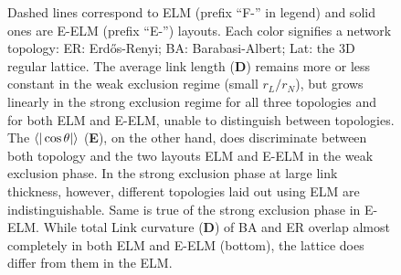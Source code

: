 \documentclass[nofootinbib,preprint,floatfix,titlepage,endfloats]{revtex4} %
\begin{document}
\begin{figure}
{         Dashed lines correspond to ELM (prefix ``F-'' in legend) and solid ones are E-ELM (prefix ``E-'') layouts. Each color signifies a network topology: ER: Erdős-Renyi; BA: Barabasi-Albert; Lat: the 3D regular lattice. 
         The average link length ({\bf D})  
         remains more or less constant in the weak exclusion regime (small $r_L/r_N$), but grows linearly in the strong exclusion regime for all three topologies and for both ELM and E-ELM, unable to distinguish between topologies.  
         The $\be{|\cos\theta |}$ ({\bf E}), on the other hand, does discriminate between both topology and the two layouts ELM and E-ELM in the weak exclusion phase. 
         In the strong exclusion phase at large link thickness, however, different topologies laid out using ELM are indistinguishable. Same is true of the strong exclusion phase in E-ELM. 
         While total Link curvature ({\bf D}) of BA and ER overlap almost completely in both ELM and E-ELM (bottom), the lattice does differ from them in the ELM. }    
    \label{fig:phase-compare}
\end{figure}
\end{document}
